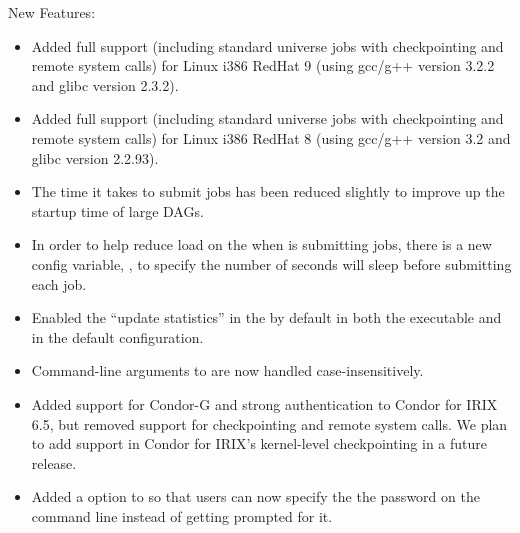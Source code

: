 \noindent New Features:

\begin{itemize}

\item Added full support (including standard universe jobs with
  checkpointing and remote system calls) for Linux i386 RedHat 9
  (using gcc/g++ version 3.2.2 and glibc version 2.3.2). 

\item Added full support (including standard universe jobs with
  checkpointing and remote system calls) for Linux i386 RedHat 8
  (using gcc/g++ version 3.2 and glibc version 2.2.93). 

\item The time it takes  to submit jobs has been
      reduced slightly to improve up the startup time of large DAGs.

\item In order to help reduce load on the  when
       is submitting jobs, there is a new config
      variable, , to specify the number
      of seconds  will sleep before submitting each
      job.

\item Enabled the ``update statistics'' in the  by
      default in both the executable and in the default configuration.

\item Command-line arguments to  are now handled
      case-insensitively.


\item Added support for Condor-G and strong authentication to Condor
  for IRIX 6.5, but removed support for checkpointing and remote
  system calls.
  We plan to add support in Condor for IRIX's kernel-level
  checkpointing in a future release.

\item Added a  option to  so that users
can now specify the the password on the command line instead of getting
prompted for it.


\end{itemize}
